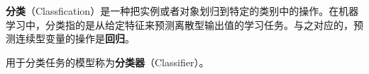 
\textbf{分类}（Classfication）是一种把实例或者对象划归到特定的类别中的操作。在机器学习中，分类指的是从给定特征来预测离散型输出值的学习任务。与之对应的，预测连续型变量的操作是\textbf{回归}。

用于分类任务的模型称为\textbf{分类器}（Classifier）。